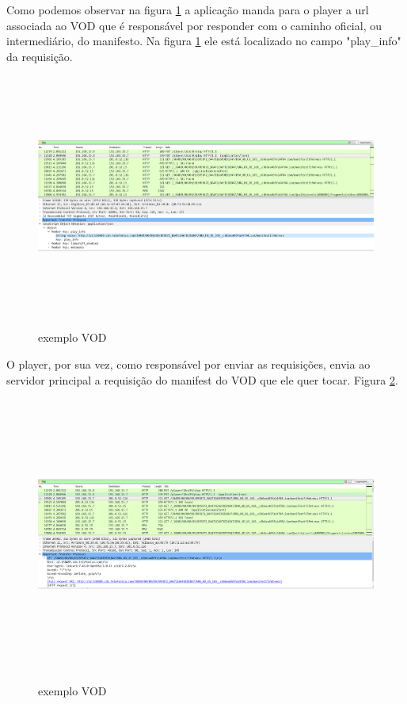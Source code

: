 Como podemos observar na figura \ref{figura:exemplo_vod_1} a aplica\c{c}\~ao manda para o player a url associada ao VOD que \'e respons\'avel por responder com o caminho oficial, ou intermedi\'ario, do manifesto. Na figura \ref{figura:exemplo_vod_1} ele est\'a localizado no campo "play\_info" da requisi\c{c}\~ao.
\begin{figure}[H]
\caption{exemplo VOD}
\includegraphics[height=8cm]{Figuras/exemplo_vod_1.png} 
\label{figura:exemplo_vod_1}
\end{figure}

O player, por sua vez, como respons\'avel por enviar as requisi\c{c}\~oes, envia ao servidor principal a requisi\c{c}\~ao do manifest do VOD que ele quer tocar. Figura \ref{figura:exemplo_vod_2}.
\begin{figure}[H]
\caption{exemplo VOD}
\includegraphics[height=9cm]{Figuras/exemplo_vod_2.png} 
\label{figura:exemplo_vod_2}
\end{figure}


